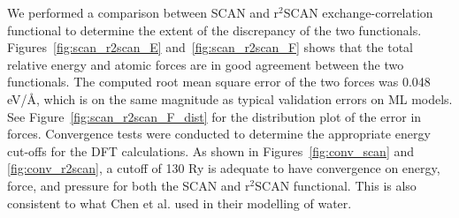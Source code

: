 We performed a comparison between SCAN	and r$^2$SCAN exchange-correlation
functional to determine the extent of the discrepancy of the two functionals.
Figures~\ref{fig:scan_r2scan_E} and~\ref{fig:scan_r2scan_F}
shows that the total relative energy and atomic forces are in good agreement
between the two functionals. The computed root mean square error of the two
forces was
0.048 \unit{eV/\angstrom}, which is on the same magnitude as typical
validation
errors
on ML models. See Figure~\ref{fig:scan_r2scan_F_dist} for the distribution
plot of the error in forces.  Convergence tests were conducted
to determine the appropriate
energy cut-offs for the DFT calculations. As shown in
Figures~\ref{fig:conv_scan} and \ref{fig:conv_r2scan}, a  cutoff of 130 Ry  is
adequate to have convergence on  energy, force, and pressure for both the SCAN
and r$^2$SCAN functional. This is also consistent to what Chen et al.
\cite{chen2017ab} used in
their modelling of water.
